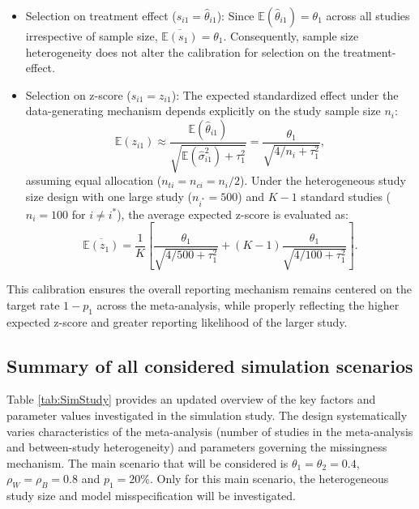 \documentclass[11pt]{article}
\begin{document}
\begin{itemize}
    \item Selection on treatment effect ($s_{i1} = \hat{\theta}_{i1}$): 
    Since $\mathbb{E}(\hat{\theta}_{i1}) = \theta_1$ across all studies irrespective of sample size, $\overline{\mathbb{E}(s_1)} = \theta_1$. Consequently, sample size heterogeneity does not alter the calibration for selection on the treatment-effect.

    \item Selection on z-score ($s_{i1} = z_{i1}$):
    The expected standardized effect under the data-generating mechanism depends explicitly on the study sample size $n_i$:
    \begin{equation*}
        \mathbb{E}(z_{i1}) \approx \frac{\mathbb{E}(\hat{\theta}_{i1})}{\sqrt{\mathbb{E}(\hat{\sigma}^2_{i1}) + \tau_1^2}} = \frac{\theta_1}{\sqrt{4/n_i + \tau_1^2}},
    \end{equation*}
    assuming equal allocation ($n_{ti} = n_{ci} = n_i/2$). Under the heterogeneous study size design with one large study ($n_{i^\ast} = 500$) and $K-1$ standard studies ($n_i = 100$ for $i \neq i^\ast$), the average expected z-score is evaluated as:
    \begin{equation*}
        \overline{\mathbb{E}(z_1)} = \frac{1}{K} \left[ \frac{\theta_1}{\sqrt{4/500 + \tau_1^2}} + (K - 1) \frac{\theta_1}{\sqrt{4/100 + \tau_1^2}} \right].
    \end{equation*}
\end{itemize}
This calibration ensures the overall reporting mechanism remains centered on the target rate $1 - p_1$ across the meta-analysis, while properly reflecting the higher expected z-score and greater reporting likelihood of the larger study.

\subsection{Summary of all considered simulation scenarios}

Table \ref{tab:SimStudy} provides an updated overview of the key factors and parameter values investigated in the simulation study. The design systematically varies characteristics of the meta-analysis (\eg number of studies in the meta-analysis and between-study heterogeneity) and parameters governing the missingness mechanism. The main scenario that will be considered is $\theta_1 = \theta_2 = 0.4$, $\rho_W = \rho_B = 0.8$ and $p_1 = 20\%$. Only for this main scenario, the heterogeneous study size and model misspecification will be investigated.
\end{document}
